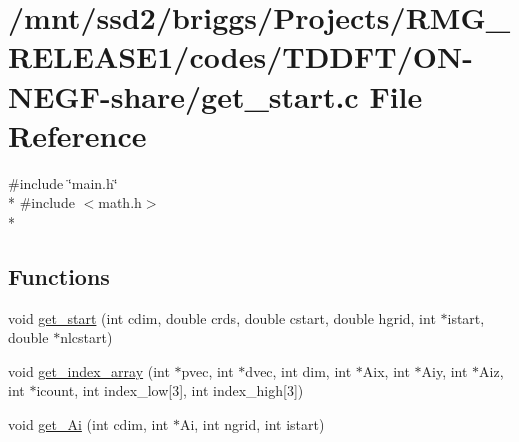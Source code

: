 \hypertarget{_t_d_d_f_t_2_o_n-_n_e_g_f-share_2get__start_8c}{\section{/mnt/ssd2/briggs/\-Projects/\-R\-M\-G\-\_\-\-R\-E\-L\-E\-A\-S\-E1/codes/\-T\-D\-D\-F\-T/\-O\-N-\/\-N\-E\-G\-F-\/share/get\-\_\-start.c File Reference}
\label{_t_d_d_f_t_2_o_n-_n_e_g_f-share_2get__start_8c}
}
{\ttfamily \#include \char`\"{}main.\-h\char`\"{}}\\*
{\ttfamily \#include $<$math.\-h$>$}\\*
\subsection*{Functions}
\begin{DoxyCompactItemize}
\item 
void \hyperlink{_t_d_d_f_t_2_o_n-_n_e_g_f-share_2get__start_8c_ab0edde6b492b46f80a7454630be5d260}{get\-\_\-start} (int cdim, double crds, double cstart, double hgrid, int $\ast$istart, double $\ast$nlcstart)
\item 
void \hyperlink{_t_d_d_f_t_2_o_n-_n_e_g_f-share_2get__start_8c_a5f53ac26e982aa99b7c99e4b6b470602}{get\-\_\-index\-\_\-array} (int $\ast$pvec, int $\ast$dvec, int dim, int $\ast$Aix, int $\ast$Aiy, int $\ast$Aiz, int $\ast$icount, int index\-\_\-low\mbox{[}3\mbox{]}, int index\-\_\-high\mbox{[}3\mbox{]})
\item 
void \hyperlink{_t_d_d_f_t_2_o_n-_n_e_g_f-share_2get__start_8c_a58036a52ab5546b6c21ac7e258385ed1}{get\-\_\-\-Ai} (int cdim, int $\ast$Ai, int ngrid, int istart)
\end{DoxyCompactItemize}


